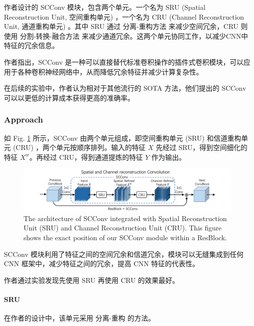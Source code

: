 \documentclass[a4paper]{ctexart}
\begin{document}
	作者设计的 SCConv 模块，包含两个单元。一个名为 SRU (Spatial Reconstruction Unit, 空间重构单元) ，一个名为 CRU (Channel Reconstruction Unit, 通道重构单元) 。其中 SRU 通过 分离-重构方法 来减少空间冗余，CRU 则使用 分割-转换-融合方法 来减少通道冗余。这两个单元协同工作，以减少CNN中特征的冗余信息。
	
	作者指出，SCConv 是一种可以直接替代标准卷积操作的插件式卷积模块，可以应用于各种卷积神经网络中，从而降低冗余特征并减少计算复杂性。
	
	在后续的实验中，作者认为相对于其他流行的 SOTA 方法，他们提出的 SCConv 可以以更低的计算成本获得更高的准确率。
	
	\subsubsection{Approach}
	
	如 Fig. \ref{fig: SCConv} 所示，SCConv 由两个单元组成，即空间重构单元 (SRU) 和信道重构单元 (CRU) ，两个单元按顺序排列。输入的特征 $X$ 先经过 SRU，得到空间细化的特征 $X^{w}$。再经过 CRU，得到通道提炼的特征 $Y$ 作为输出。
	
	\begin{figure}[htbp]
		\centering 
		\includegraphics[width=\columnwidth]{picture/LLIE/SCConv/SCConv}
		\caption{
			\label{fig: SCConv} 
			The architecture of SCConv integrated with Spatial Reconstruction Unit (SRU) and Channel Reconstruction Unit (CRU). This figure shows the exact position of our SCConv module within a ResBlock.
		}
	\end{figure}
	
	SCConv 模块利用了特征之间的空间冗余和信道冗余，模块可以无缝集成到任何 CNN 框架中，减少特征之间的冗余，提高 CNN 特征的代表性。
	
	作者通过实验发现先使用 SRU 再使用 CRU 的效果最好。
	
	\paragraph{SRU}
	
	在作者的设计中，该单元采用 分离-重构 的方法。
	
\end{document}
